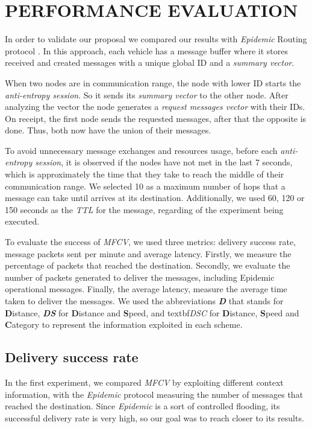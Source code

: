 \documentclass[letterpaper, 10 pt, conference]{ieeeconf}  %
\begin{document}
\section{PERFORMANCE EVALUATION}

In order to validate our proposal we compared our results with \emph{Epidemic} Routing protocol \cite{Vahdat-2000}. In this approach, each vehicle has a message buffer where it stores received and created messages with a unique global ID and a \emph{summary vector}.

When two nodes are in communication range, the node with lower ID starts the \emph{anti-entropy session}. So it sends its \emph{summary vector} to the other node. After analyzing the vector the node generates a \emph{request messages vector} with their IDs. On receipt, the first node sends the requested messages, after that the opposite is done. Thus, both now have the union of their messages.

To avoid unnecessary message exchanges and resources usage, before each \emph{anti-entropy session}, it is observed if the nodes have not met in the last 7 seconds, which is approximately the time that they take to reach the middle of their communication range. We selected 10 as a maximum number of hops that a message can take until arrives at its destination. Additionally, we used 60, 120 or 150 seconds as the \emph{TTL} for the message, regarding of the experiment being executed.

To evaluate the success of \emph{MFCV}, we used three metrics: delivery success rate, message packets sent per minute and average latency. Firstly, we measure the percentage of packets that reached the destination. Secondly, we evaluate the number of packets generated to deliver the messages, including Epidemic operational messages. Finally, the average latency, measure the average time taken to deliver the messages. We used the abbreviations \textbf{\emph{D}} that stands for \textbf{D}istance, \textbf{\emph{DS}} for \textbf{D}istance and \textbf{S}peed, and textbf{\emph{DSC}} for \textbf{D}istance, \textbf{S}peed and \textbf{C}ategory to represent the information exploited in each scheme.

\subsection{Delivery success rate}

In the first experiment, we compared \emph{MFCV} by exploiting different context information, with the \emph{Epidemic} protocol measuring the number of messages that reached the destination. Since \emph{Epidemic} is a sort of controlled flooding, its successful delivery rate is very high, so our goal was to reach closer to its results.
\end{document}
